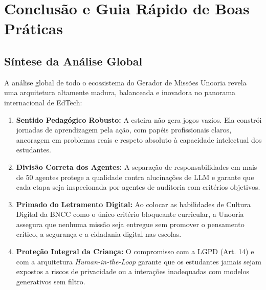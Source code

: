 \documentclass[11pt,a4paper]{article}
\begin{document}
\section{Conclusão e Guia Rápido de Boas Práticas}
\label{sec:conclusao}

\subsection{Síntese da Análise Global}
A análise global de todo o ecossistema do Gerador de Missões Unooria revela uma arquitetura altamente madura, balanceada e inovadora no panorama internacional de EdTech:
\begin{enumerate}
  \item \textbf{Sentido Pedagógico Robusto:} A esteira não gera jogos vazios. Ela constrói jornadas de aprendizagem pela ação, com papéis profissionais claros, ancoragem em problemas reais e respeto absoluto à capacidade intelectual dos estudantes.
  \item \textbf{Divisão Correta dos Agentes:} A separação de responsabilidades em mais de 50 agentes protege a qualidade contra alucinações de LLM e garante que cada etapa seja inspecionada por agentes de auditoria com critérios objetivos.
  \item \textbf{Primado do Letramento Digital:} Ao colocar as habilidades de Cultura Digital da BNCC como o único critério bloqueante curricular, a Unooria assegura que nenhuma missão seja entregue sem promover o pensamento crítico, a segurança e a cidadania digital nas escolas.
  \item \textbf{Proteção Integral da Criança:} O compromisso com a LGPD (Art. 14) e com a arquitetura \textit{Human-in-the-Loop} garante que os estudantes jamais sejam expostos a riscos de privacidade ou a interações inadequadas com modelos generativos sem filtro.
\end{enumerate}
\end{document}

